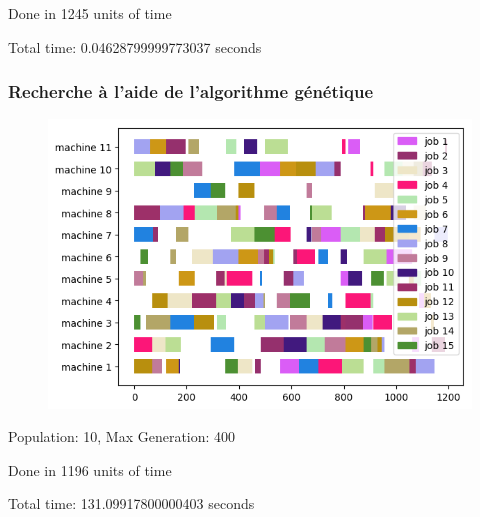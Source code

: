 Done in 1245 units of time

Total time: 0.04628799999773037 seconds 
\frameboxend

\newpage

\subsubsection{Recherche à l'aide de l'algorithme génétique}

\begin{figure}[!h]
    \centering
    \includegraphics[]{results/barnes_setb4c9_genetic.png}
\end{figure}

Population: 10, Max Generation: 400

Done in 1196 units of time

Total time: 131.09917800000403 seconds
\frameboxend